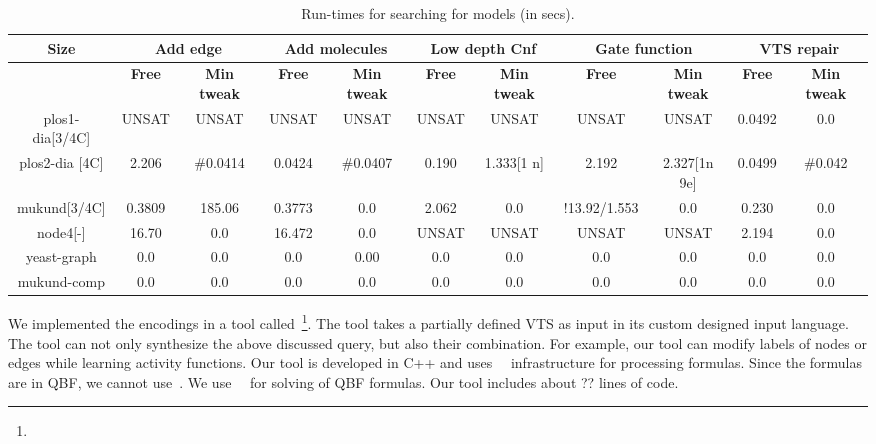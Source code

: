 
\begin{table}[t]
  \centering
  \begin{tabular}[t]{|c|c|c|c|c|c|c|c|c|c|c}\hline
    {\multirow{2}{*} \textbf{Size}}  & \multicolumn{2}{c|}{\textbf{Add edge}} & \multicolumn{2}{c|}{\textbf{Add molecules}} & \multicolumn{2}{c|}{\textbf{Low depth Cnf}}  &  \multicolumn{2}{c|}{\textbf{Gate function}} &  \multicolumn{2}{c|}{\textbf{VTS repair}} \\\hline
   
   \cline{2-9}
    {} & {\textbf{Free}} & {\textbf{Min tweak}} & {\textbf{Free}} & {\textbf{Min tweak}} & {\textbf{Free}} & {\textbf{Min tweak}} & {\textbf{Free}} & {\textbf{Min tweak}} & {\textbf{Free}} & {\textbf{Min tweak}} \\\hline
    
    plos1-dia[3/4C] & UNSAT & UNSAT & UNSAT & UNSAT & UNSAT & UNSAT & UNSAT & UNSAT & 0.0492 & 0.0\\\hline
    plos2-dia [4C] & 2.206 & \#0.0414 & 0.0424 & \#0.0407 & 0.190 & 1.333[1 n] & 2.192 & 2.327[1n 9e] & 0.0499 & \#0.042 \\\hline
    mukund[3/4C] & 0.3809 & 185.06 & 0.3773 & 0.0 & 2.062 & 0.0 & !13.92/1.553 & 0.0 & 0.230 & 0.0 \\\hline
    node4[-] & 16.70 & 0.0 & 16.472 & 0.0 & UNSAT & UNSAT & UNSAT & UNSAT & 2.194 & 0.0\\\hline
    yeast-graph & 0.0 & 0.0 & 0.0 & 0.00 & 0.0 & 0.0 & 0.0  & 0.0 & 0.0 & 0.0 \\\hline
    mukund-comp & 0.0 & 0.0 & 0.0 & 0.0 & 0.0 & 0.0 & 0.0 & 0.0 & 0.0 & 0.0\\\hline
  \end{tabular}
  \caption{Run-times for searching for models (in secs).}
  \label{tab:qf-grabh}
\end{table}


We implemented the encodings in a tool called~\ourtool\footnote{}.
%
The tool takes a partially defined VTS as input in its custom designed
input language.
%
The tool can not only synthesize the above discussed query, but also their
combination.
%
For example, our tool can modify labels of nodes or edges while
learning activity functions.
%
Our tool is developed in C++ and uses~\zthree~\cite{z3} infrastructure for
processing formulas. Since the formulas are in QBF, we cannot use~\zthree.
%
We use~\depqbf~\cite{depqbf} for solving of QBF formulas.
%
Our tool includes about ?? lines of code.

